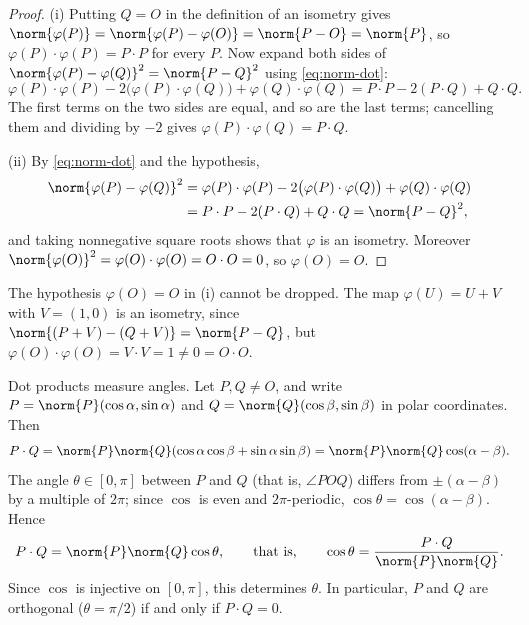 \begin{proof}
	(i) Putting \(Q = O\) in the definition of an isometry gives
	\(\norm{\varphi(P)} = \norm{\varphi(P) - \varphi(O)} = \norm{P - O} = \norm{P}\), so
	\(\varphi(P)\cdot\varphi(P) = P\cdot P\) for every \(P\). Now expand both sides of
	\(\norm{\varphi(P)-\varphi(Q)}^2 = \norm{P-Q}^2\) using \eqref{eq:norm-dot}:
	\[
		\varphi(P)\cdot\varphi(P) - 2\bigl(\varphi(P)\cdot\varphi(Q)\bigr)
		+ \varphi(Q)\cdot\varphi(Q)
		= P\cdot P - 2(P\cdot Q) + Q\cdot Q.
	\]
	The first terms on the two sides are equal, and so are the last terms; cancelling them
	and dividing by \(-2\) gives \(\varphi(P)\cdot\varphi(Q) = P\cdot Q\).

	(ii) By \eqref{eq:norm-dot} and the hypothesis,
	\begin{align*}
		\norm{\varphi(P)-\varphi(Q)}^2
		 & = \varphi(P)\cdot\varphi(P) - 2\bigl(\varphi(P)\cdot\varphi(Q)\bigr)
		+ \varphi(Q)\cdot\varphi(Q)                                            \\
		 & = P\cdot P - 2(P\cdot Q) + Q\cdot Q = \norm{P-Q}^2,
	\end{align*}
	and taking nonnegative square roots shows that \(\varphi\) is an isometry. Moreover
	\(\norm{\varphi(O)}^2 = \varphi(O)\cdot\varphi(O) = O\cdot O = 0\), so
	\(\varphi(O) = O\).
\end{proof}

\begin{remark}
	The hypothesis \(\varphi(O) = O\) in (i) cannot be dropped. The map
	\(\varphi(U) = U + V\) with \(V = (1,0)\) is an isometry, since
	\(\norm{(P+V) - (Q+V)} = \norm{P-Q}\), but
	\(\varphi(O)\cdot\varphi(O) = V\cdot V = 1 \neq 0 = O\cdot O\).
\end{remark}

Dot products measure angles. Let \(P, Q \neq O\), and write
\(P = \norm{P}(\cos\alpha, \sin\alpha)\) and \(Q = \norm{Q}(\cos\beta, \sin\beta)\) in
polar coordinates. Then
\[
	P\cdot Q
	= \norm{P}\norm{Q}(\cos\alpha\cos\beta + \sin\alpha\sin\beta)
	= \norm{P}\norm{Q}\cos(\alpha - \beta).
\]
The angle \(\theta \in [0,\pi]\) between \(P\) and \(Q\) (that is, \(\angle POQ\)) differs
from \(\pm(\alpha - \beta)\) by a multiple of \(2\pi\); since \(\cos\) is even and
\(2\pi\)-periodic, \(\cos\theta = \cos(\alpha-\beta)\). Hence
\begin{equation}\label{eq:dot-angle}
	P\cdot Q = \norm{P}\norm{Q}\cos\theta,
	\qquad\text{that is,}\qquad
	\cos\theta = \frac{P\cdot Q}{\norm{P}\norm{Q}}.
\end{equation}
Since \(\cos\) is injective on \([0,\pi]\), this determines \(\theta\). In particular,
\(P\) and \(Q\) are orthogonal (\(\theta = \pi/2\)) if and only if \(P\cdot Q = 0\).

